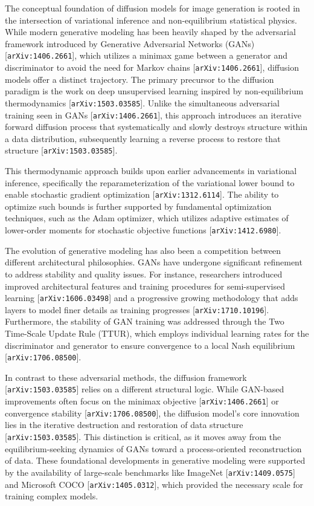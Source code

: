 \documentclass[11pt]{article}
\begin{document}
The conceptual foundation of diffusion models for image generation is rooted in the intersection of variational inference and non-equilibrium statistical physics. While modern generative modeling has been heavily shaped by the adversarial framework introduced by Generative Adversarial Networks (GANs) [\texttt{arXiv:1406.2661}], which utilizes a minimax game between a generator and discriminator to avoid the need for Markov chains [\texttt{arXiv:1406.2661}], diffusion models offer a distinct trajectory. The primary precursor to the diffusion paradigm is the work on deep unsupervised learning inspired by non-equilibrium thermodynamics [\texttt{arXiv:1503.03585}]. Unlike the simultaneous adversarial training seen in GANs [\texttt{arXiv:1406.2661}], this approach introduces an iterative forward diffusion process that systematically and slowly destroys structure within a data distribution, subsequently learning a reverse process to restore that structure [\texttt{arXiv:1503.03585}].

This thermodynamic approach builds upon earlier advancements in variational inference, specifically the reparameterization of the variational lower bound to enable stochastic gradient optimization [\texttt{arXiv:1312.6114}]. The ability to optimize such bounds is further supported by fundamental optimization techniques, such as the Adam optimizer, which utilizes adaptive estimates of lower-order moments for stochastic objective functions [\texttt{arXiv:1412.6980}].

The evolution of generative modeling has also been a competition between different architectural philosophies. GANs have undergone significant refinement to address stability and quality issues. For instance, researchers introduced improved architectural features and training procedures for semi-supervised learning [\texttt{arXiv:1606.03498}] and a progressive growing methodology that adds layers to model finer details as training progresses [\texttt{arXiv:1710.10196}]. Furthermore, the stability of GAN training was addressed through the Two Time-Scale Update Rule (TTUR), which employs individual learning rates for the discriminator and generator to ensure convergence to a local Nash equilibrium [\texttt{arXiv:1706.08500}].

In contrast to these adversarial methods, the diffusion framework [\texttt{arXiv:1503.03585}] relies on a different structural logic. While GAN-based improvements often focus on the minimax objective [\texttt{arXiv:1406.2661}] or convergence stability [\texttt{arXiv:1706.08500}], the diffusion model's core innovation lies in the iterative destruction and restoration of data structure [\texttt{arXiv:1503.03585}]. This distinction is critical, as it moves away from the equilibrium-seeking dynamics of GANs toward a process-oriented reconstruction of data. These foundational developments in generative modeling were supported by the availability of large-scale benchmarks like ImageNet [\texttt{arXiv:1409.0575}] and Microsoft COCO [\texttt{arXiv:1405.0312}], which provided the necessary scale for training complex models.
\end{document}
